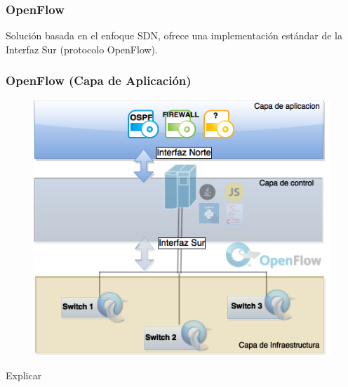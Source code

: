 \documentclass{beamer}
\begin{document}
\begin{frame}
\frametitle{OpenFlow} 

Soluci\'on basada en el enfoque SDN, ofrece una implementaci\'on est\'andar de la Interfaz Sur (protocolo OpenFlow).


\end{frame}

\begin{frame}
\frametitle{OpenFlow (Capa de Aplicaci\'on)} 

\begin{minipage}{0.40\textwidth}
	\begin{figure}[H]
		\centering
		\includegraphics[width=1.0\textwidth]{imagenes/openflowApplication.png}
	\end{figure}

\end{minipage}
\hfill
\begin{minipage}{0.58\textwidth}

Explicar



\end{minipage}

\end{frame}
\end{document}
